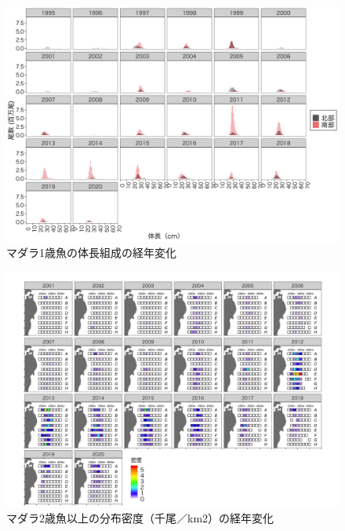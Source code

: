 \documentclass[11pt]{article} %
\begin{document}
\begin{linenumbers}
\begin{figure}[h]
  \centering
  \includegraphics[width = 14cm]{マダラ1+length.png}
  \caption{マダラ1歳魚の体長組成の経年変化}
\end{figure}

\begin{figure}[h]
  \centering
  \includegraphics[width = 14cm]{マダラ２＋dens.png}
  \caption{マダラ2歳魚以上の分布密度（千尾／km2）の経年変化}
\end{figure}


\end{linenumbers}
\end{document}
